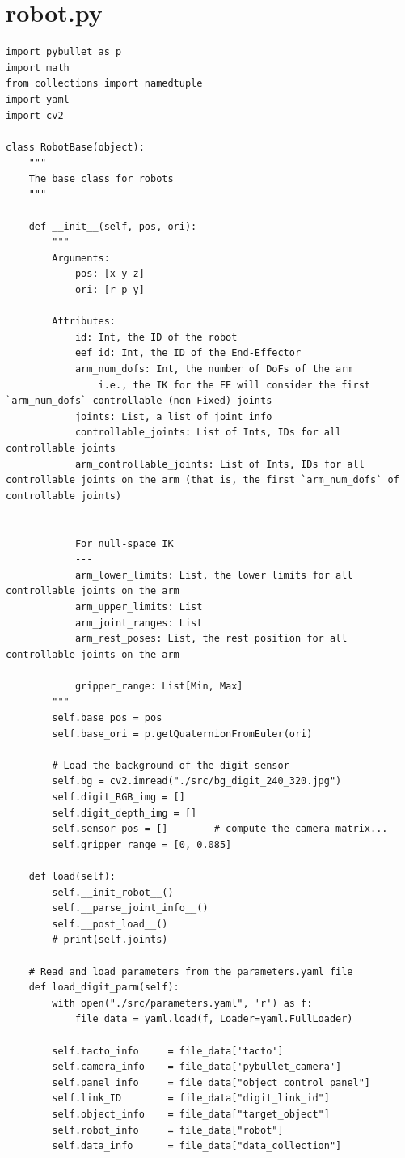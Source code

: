 \documentclass[11pt, a4paper]{report}
\begin{document}
\section{robot.py}
\begin{lstlisting}
import pybullet as p
import math
from collections import namedtuple
import yaml
import cv2

class RobotBase(object):
    """
    The base class for robots
    """

    def __init__(self, pos, ori):
        """
        Arguments:
            pos: [x y z]
            ori: [r p y]

        Attributes:
            id: Int, the ID of the robot
            eef_id: Int, the ID of the End-Effector
            arm_num_dofs: Int, the number of DoFs of the arm
                i.e., the IK for the EE will consider the first `arm_num_dofs` controllable (non-Fixed) joints
            joints: List, a list of joint info
            controllable_joints: List of Ints, IDs for all controllable joints
            arm_controllable_joints: List of Ints, IDs for all controllable joints on the arm (that is, the first `arm_num_dofs` of controllable joints)

            ---
            For null-space IK
            ---
            arm_lower_limits: List, the lower limits for all controllable joints on the arm
            arm_upper_limits: List
            arm_joint_ranges: List
            arm_rest_poses: List, the rest position for all controllable joints on the arm

            gripper_range: List[Min, Max]
        """
        self.base_pos = pos
        self.base_ori = p.getQuaternionFromEuler(ori)

        # Load the background of the digit sensor
        self.bg = cv2.imread("./src/bg_digit_240_320.jpg")
        self.digit_RGB_img = []
        self.digit_depth_img = []
        self.sensor_pos = []        # compute the camera matrix...
        self.gripper_range = [0, 0.085]

    def load(self):
        self.__init_robot__()
        self.__parse_joint_info__()
        self.__post_load__()
        # print(self.joints)

    # Read and load parameters from the parameters.yaml file 
    def load_digit_parm(self):
        with open("./src/parameters.yaml", 'r') as f:
            file_data = yaml.load(f, Loader=yaml.FullLoader)

        self.tacto_info     = file_data['tacto']
        self.camera_info    = file_data['pybullet_camera']
        self.panel_info     = file_data["object_control_panel"]
        self.link_ID        = file_data["digit_link_id"]
        self.object_info    = file_data["target_object"]
        self.robot_info     = file_data["robot"]
        self.data_info      = file_data["data_collection"]



\end{lstlisting}
\end{document}

